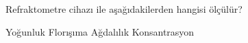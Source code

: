 \begin{question}[subtitle=]
  Refraktometre cihazı ile aşağıdakilerden hangisi ölçülür?
	\begin{tasks}
          \task Yoğunluk
          \task Florışıma
          \task Ağdalılık
          \task Konsantrasyon \correct
	\end{tasks}
\end{question}
\begin{solution}
	\correct
\end{solution}
